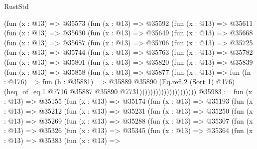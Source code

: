 \begin{lexlean}{RustStd}
\begin{coremodule}
        (fun (x : @13) =>
        @35573
          (fun (x : @13) =>
          @35592
            (fun (x : @13) =>
            @35611
              (fun (x : @13) =>
              @35630
                (fun (x : @13) =>
                @35649
                  (fun (x : @13) =>
                  @35668
                    (fun (x : @13) =>
                    @35687
                      (fun (x : @13) =>
                      @35706
                        (fun (x : @13) =>
                        @35725
                          (fun (x : @13) =>
                          @35744
                            (fun (x : @13) =>
                            @35763
                              (fun (x : @13) =>
                              @35782
                                (fun (x : @13) =>
                                @35801
                                  (fun (x : @13) =>
                                  @35820
                                    (fun (x : @13) =>
                                    @35839
                                      (fun (x : @13) =>
                                      @35858
                                        (fun (x : @13) =>
                                        @35877
                                          (fun (x : @13) =>
                                          fun (fn : @176) =>
                                          fun (h : @35881) =>
                                          @35889
                                            @35890
                                            (Eq.refl.{2} (Sort 1) @176)
                                            (heq_of_eq.{1}
                                              @7716
                                              @35887
                                              @35890
                                              @7731)))))))))))))))))))))
@35983 := fun (x : @13) =>
  @35155
    (fun (x : @13) =>
    @35174
      (fun (x : @13) =>
      @35193
        (fun (x : @13) =>
        @35212
          (fun (x : @13) =>
          @35231
            (fun (x : @13) =>
            @35250
              (fun (x : @13) =>
              @35269
                (fun (x : @13) =>
                @35288
                  (fun (x : @13) =>
                  @35307
                    (fun (x : @13) =>
                    @35326
                      (fun (x : @13) =>
                      @35345
                        (fun (x : @13) =>
                        @35364
                          (fun (x : @13) =>
                          @35383
                            (fun (x : @13) =>

\end{coremodule}
\end{lexlean}
